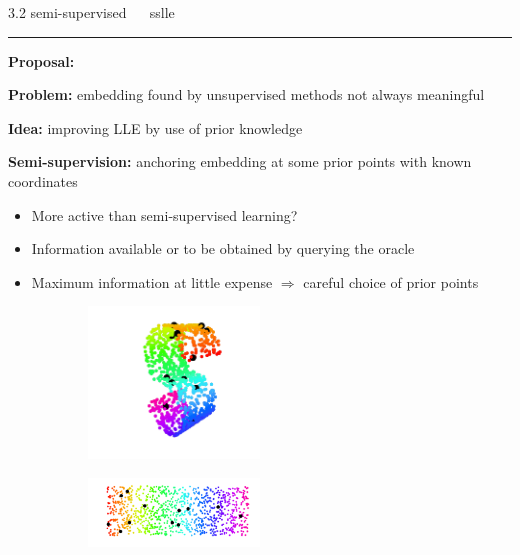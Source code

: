 \documentclass[11pt, compress, t, notes = noshow, xcolor = table, 
aspectratio = 1610]{beamer}
\newcommand{\highlight}[1]{\textcolor{highlightcol}{\textbf{#1}}}
\newcommand{\arritem}{\item[\highlight{$\rightarrow$}]}
\begin{document}
\LARGE
\begin{frame}{\textcolor{gray!90}{3.2 semi-supervised} ~~ sslle}
\normalsize
\vspace{-0.5cm}
\noindent \textcolor{gray!90}{\rule{\textwidth}{1pt}}
\smallskip

\textbf{Proposal:} \citet{yangetal2006}

\vspace{0.3cm}

\textbf{Problem:} embedding found by unsupervised methods not always meaningful

\vspace{0.3cm}

\textbf{Idea:} improving LLE by use of prior knowledge

\vspace{0.3cm}

\textbf{Semi-supervision:} anchoring embedding at some prior points with known 
coordinates

\begin{itemize}
  \arritem More active than semi-supervised learning?
  \arritem Information available or to be obtained by querying the 
  oracle
  \arritem Maximum information at little expense $\Rightarrow$ careful 
  choice of prior points
\end{itemize}


\begin{figure}[H]
 \begin{subfigure}[c]{0.2\textwidth}
  \centering
   \includegraphics[trim = 70 30 70 30, clip, %
      width = 0.5\textwidth]{figures/s_curve_pp_random}
 \end{subfigure}
 \hfill
 \begin{subfigure}[c]{0.7\textwidth}
   \includegraphics[trim = 80 20 0 0, clip, %
      width = 0.5\textwidth]{figures/s_curve_undone_pp_random}
 \end{subfigure}
\end{figure}

\end{frame}
\end{document}
